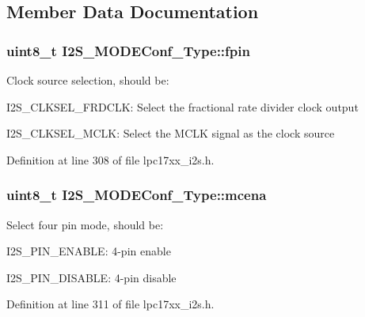 \subsection{\-Member \-Data \-Documentation}
\hypertarget{struct_i2_s___m_o_d_e_conf___type_a2def5f397a120304356ac08f927c3751}{
\subsubsection[{fpin}]{\setlength{\rightskip}{0pt plus 5cm}uint8\-\_\-t {\bf \-I2\-S\-\_\-\-M\-O\-D\-E\-Conf\-\_\-\-Type\-::fpin}}}\label{struct_i2_s___m_o_d_e_conf___type_a2def5f397a120304356ac08f927c3751}
\-Clock source selection, should be\-:
\begin{DoxyItemize}
\item \-I2\-S\-\_\-\-C\-L\-K\-S\-E\-L\-\_\-\-F\-R\-D\-C\-L\-K\-: \-Select the fractional rate divider clock output
\item \-I2\-S\-\_\-\-C\-L\-K\-S\-E\-L\-\_\-\-M\-C\-L\-K\-: \-Select the \-M\-C\-L\-K signal as the clock source 
\end{DoxyItemize}

\-Definition at line 308 of file lpc17xx\-\_\-i2s.\-h.

\hypertarget{struct_i2_s___m_o_d_e_conf___type_a5b19284e04f77360ba075d068a41a420}{
\subsubsection[{mcena}]{\setlength{\rightskip}{0pt plus 5cm}uint8\-\_\-t {\bf \-I2\-S\-\_\-\-M\-O\-D\-E\-Conf\-\_\-\-Type\-::mcena}}}\label{struct_i2_s___m_o_d_e_conf___type_a5b19284e04f77360ba075d068a41a420}
\-Select four pin mode, should be\-:
\begin{DoxyItemize}
\item \-I2\-S\-\_\-P\-I\-N\-\_\-\-E\-N\-A\-B\-L\-E\-: 4-\/pin enable
\item \-I2\-S\-\_\-P\-I\-N\-\_\-\-D\-I\-S\-A\-B\-L\-E\-: 4-\/pin disable 
\end{DoxyItemize}

\-Definition at line 311 of file lpc17xx\-\_\-i2s.\-h.

